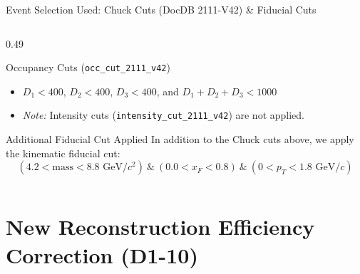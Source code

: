 \documentclass[aspectratio=169, 10pt]{beamer}
\begin{document}
\begin{frame}{Event Selection Used: Chuck Cuts (DocDB 2111-V42) \& Fiducial Cuts}
\begin{columns}[T, onlytextwidth]
\begin{column}{0.49\textwidth}
        \begin{block}{\scriptsize Occupancy Cuts (\texttt{occ\_cut\_2111\_v42})}
            \tiny
            \begin{itemize}
                \item $D_1 < 400$, $D_2 < 400$, $D_3 < 400$, and $D_1 + D_2 + D_3 < 1000$
                \item \textit{Note:} Intensity cuts (\texttt{intensity\_cut\_2111\_v42}) are not applied.
            \end{itemize}
        \end{block}

        \begin{alertblock}{\scriptsize Additional Fiducial Cut Applied}
            \tiny
            In addition to the Chuck cuts above, we apply the kinematic fiducial cut:
            \[
                (4.2 < \text{mass} < 8.8\text{ GeV}/c^2) \ \& \ (0.0 < x_F < 0.8) \ \& \ (0 < p_T < 1.8\text{ GeV}/c)
            \]
        \end{alertblock}
    \end{column}
\end{columns}
\normalsize
\end{frame}

\section{New Reconstruction Efficiency Correction (D1-10)}
\end{document}
